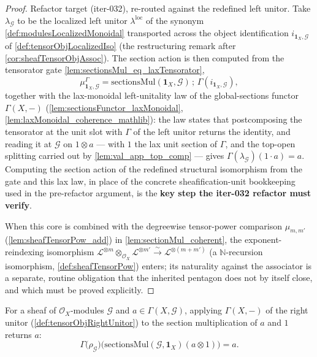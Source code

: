 \begin{proof}
  Refactor target (iter-032), re-routed against the redefined left unitor. Take
  \(\lambda_{\mathcal{G}}\) to be the localized left unitor \(\lambda^{\mathrm{loc}}\)
  of the synonym \cref{def:modulesLocalizedMonoidal} transported across the object
  identification \(i_{\mathbf{1}_X,\mathcal{G}}\) of \cref{def:tensorObjLocalizedIso}
  (the restructuring remark after \cref{cor:sheafTensorObjAssoc}). The section
  action is then computed from the tensorator gate
  \cref{lem:sectionsMul_eq_laxTensorator},
  \[
    \mu^{\Gamma}_{\mathbf{1}_X,\mathcal{G}}
      = \mathrm{sectionsMul}(\mathbf{1}_X,\mathcal{G}) \,;\,
        \Gamma(i_{\mathbf{1}_X,\mathcal{G}}),
  \]
  together with the lax-monoidal left-unitality law of the global-sections functor
  \(\Gamma(X,-)\) (\cref{lem:sectionsFunctor_laxMonoidal},
  \cref{lem:laxMonoidal_coherence_mathlib}): the law states that postcomposing the
  tensorator at the unit slot with \(\Gamma\) of the left unitor returns the
  identity, and reading it at \(\mathcal{G}\) on \(1 \otimes a\) --- with \(1\) the
  lax unit section of \(\Gamma\), and the top-open splitting carried out by
  \cref{lem:val_app_top_comp} --- gives \(\Gamma(\lambda_{\mathcal{G}})(1 \cdot a)
  = a\). Computing the section action of the redefined structural isomorphism from
  the gate and this lax law, in place of the concrete sheafification-unit
  bookkeeping used in the pre-refactor argument, is the \textbf{key step the
  iter-032 refactor must verify}.

  When this core is combined with the degreewise tensor-power comparison
  \(\mu_{m,m'}\) (\cref{lem:sheafTensorPow_add}) in \cref{lem:sectionMul_coherent},
  the exponent-reindexing isomorphism \(\mathcal{L}^{\otimes m} \otimes_{\mathcal{O}_X}
  \mathcal{L}^{\otimes m'} \xrightarrow{\ \sim\ } \mathcal{L}^{\otimes (m+m')}\)
  (a \(\mathbb{N}\)-recursion isomorphism, \cref{def:sheafTensorPow}) enters; its
  naturality against the associator is a separate, routine obligation that the
  inherited pentagon does not by itself close, and which must be proved explicitly.
\end{proof}

\begin{lemma}
  \label{lem:sectionMul_rightUnitor_core}
  For a sheaf of \(\mathcal{O}_X\)-modules \(\mathcal{G}\) and
  \(a \in \Gamma(X, \mathcal{G})\), applying \(\Gamma(X,-)\) of the right unitor
  (\cref{def:tensorObjRightUnitor}) to the section multiplication of \(a\) and
  \(1\) returns \(a\):
  \[
    \Gamma\bigl(\rho_{\mathcal{G}}\bigr)
      \bigl( \mathrm{sectionsMul}(\mathcal{G}, \mathbf{1}_X)(a \otimes 1) \bigr)
      = a .
  \]
\end{lemma}

